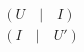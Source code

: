 \documentclass[preview]{standalone}
\begin{document}
\begin{align*}
&( U \quad \big| \quad I ) \\ &(I \quad \big| \quad U' )
\end{align*}
\end{document}

